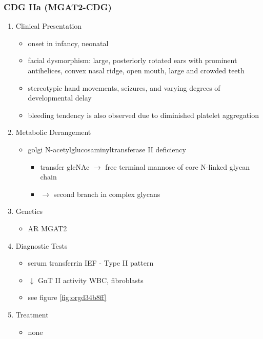 \documentclass[12pt]{scrartcl}
\begin{document}
\subsubsection{CDG IIa (MGAT2-CDG)}
\label{sec:orgd1c3aa7}
\begin{enumerate}
\item Clinical Presentation
\label{sec:org8e0fd1b}
\begin{itemize}
\item onset in infancy, neonatal
\item facial dysmorphism: large, posteriorly rotated ears with prominent
antihelices, convex nasal ridge, open mouth, large and crowded
teeth
\item stereotypic hand movements, seizures, and varying degrees of
developmental delay
\item bleeding tendency is also observed due to diminished platelet
aggregation
\end{itemize}

\item Metabolic Derangement
\label{sec:org91b1a85}
\begin{itemize}
\item golgi N-acetylglucosaminyltransferase II deficiency
\begin{itemize}
\item transfer glcNAc \(\to\) free terminal mannose of core N-linked glycan chain
\item \(\to\) second branch in complex glycans
\end{itemize}
\end{itemize}
\item Genetics
\label{sec:org652a392}
\begin{itemize}
\item AR MGAT2
\end{itemize}
\item Diagnostic Tests
\label{sec:org69a079f}
\begin{itemize}
\item serum transferrin IEF - Type II pattern
\item \(\downarrow\) GnT II activity WBC, fibroblasts
\item see figure \ref{fig:orgd34b8ff}
\end{itemize}
\item Treatment
\label{sec:orgf7fa390}
\begin{itemize}
\item none
\end{itemize}
\end{enumerate}
\end{document}

